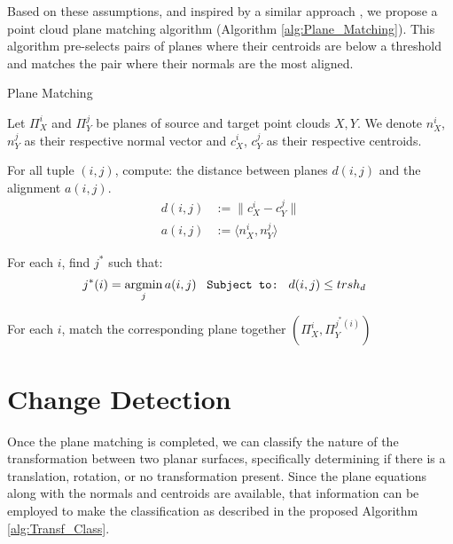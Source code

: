 Based on these assumptions, and inspired by a similar approach \cite{planematching}, we propose a point cloud plane matching algorithm (Algorithm \ref{alg:Plane_Matching}). This algorithm pre-selects pairs of planes where their centroids are below a threshold and matches the pair where their normals are the most aligned.\\

\begin{algorithm}[ht]
\caption{Plane Matching}\label{alg:Plane_Matching}
\begin{description}[leftmargin=!, labelwidth=\widthof{\textbf{Step1: }}]
    \item [Step 1:] Let $\Pi_X^i$ and $\Pi_Y^j$ be planes of source and target point clouds $X,Y$. We denote $n_X^i$, $n_Y^j$ as their respective normal vector and $c_X^i$, $c_Y^j$ as their respective centroids.
    \item [Step 2:] For all tuple $(i,j)$, compute: the distance between planes $d(i,j) $ and the alignment $a(i,j)$.
    \begin{align*}
        d(i,j) &:= \| c_X^i - c_Y^j \| \\
        a(i,j) &:= \langle n_X^i, n_Y^j\rangle
    \end{align*}
    \item [Step 3:] For each $i$, find $j^*$ such that:
        \begin{align*}
            j^*(i) &= \operatorname*{argmin}_j a(i,j) \; \; \; \texttt{Subject to:}\; \; \; d(i,j) \leq trsh_d
        \end{align*}
    \item [Step 4:] For each $i$, match the corresponding plane together $(\Pi_X^i, \Pi_Y^{j^*(i)})$
\end{description}
\end{algorithm}

\section{Change Detection}

Once the plane matching is completed, we can classify the nature of the transformation between two planar surfaces, specifically determining if there is a translation, rotation, or no transformation present. Since the plane equations along with the normals and centroids are available, that information can be employed to make the classification as described in the proposed Algorithm \ref{alg:Transf_Class}.\\

